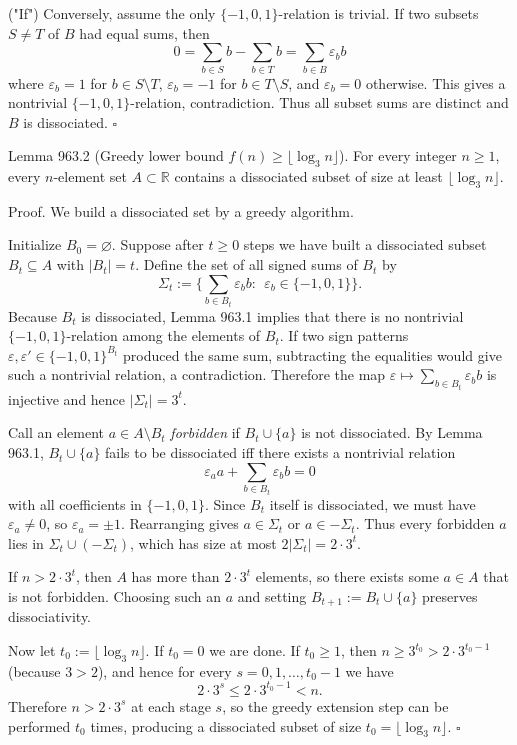 ("If") Conversely, assume the only $\{-1,0,1\}$-relation is trivial. If two subsets $S\ne T$ of $B$ had equal sums, then
\[
0=\sum_{b\in S}b-\sum_{b\in T}b=
\sum_{b\in B}\varepsilon_b b
\]
where $\varepsilon_b=1$ for $b\in S\setminus T$, $\varepsilon_b=-1$ for $b\in T\setminus S$, and $\varepsilon_b=0$ otherwise. This gives a nontrivial $\{-1,0,1\}$-relation, contradiction. Thus all subset sums are distinct and $B$ is dissociated. $\square$

Lemma 963.2 (Greedy lower bound $f(n)\ge \lfloor \log_3 n\rfloor$).
For every integer $n\ge 1$, every $n$-element set $A\subset\mathbb R$ contains a dissociated subset of size at least $\lfloor \log_3 n\rfloor$.

Proof.
We build a dissociated set by a greedy algorithm.

Initialize $B_0=\varnothing$.
Suppose after $t\ge 0$ steps we have built a dissociated subset $B_t\subseteq A$ with $|B_t|=t$.
Define the set of all signed sums of $B_t$ by
\[
\Sigma_t:=\Big\{\sum_{b\in B_t}\varepsilon_b b:\ \ \varepsilon_b\in\{-1,0,1\}\Big\}.
\]
Because $B_t$ is dissociated, Lemma 963.1 implies that there is no nontrivial $\{-1,0,1\}$-relation among the elements of $B_t$.
If two sign patterns $\varepsilon,\varepsilon'\in\{-1,0,1\}^{B_t}$ produced the same sum, subtracting the equalities would give such a nontrivial relation, a contradiction.
Therefore the map $\varepsilon\mapsto\sum_{b\in B_t}\varepsilon_b b$ is injective and hence $|\Sigma_t|=3^t$.

Call an element $a\in A\setminus B_t$ \emph{forbidden} if $B_t\cup\{a\}$ is not dissociated.
By Lemma 963.1, $B_t\cup\{a\}$ fails to be dissociated iff there exists a nontrivial relation
\[
\varepsilon_a a + \sum_{b\in B_t}\varepsilon_b b = 0
\]
with all coefficients in $\{-1,0,1\}$. Since $B_t$ itself is dissociated, we must have $\varepsilon_a\neq 0$, so $\varepsilon_a=\pm 1$.
Rearranging gives $a\in\Sigma_t$ or $a\in-\Sigma_t$.
Thus every forbidden $a$ lies in $\Sigma_t\cup(-\Sigma_t)$, which has size at most $2|\Sigma_t|=2\cdot 3^t$.

If $n>2\cdot 3^t$, then $A$ has more than $2\cdot 3^t$ elements, so there exists some $a\in A$ that is not forbidden.
Choosing such an $a$ and setting $B_{t+1}:=B_t\cup\{a\}$ preserves dissociativity.

Now let $t_0:=\lfloor\log_3 n\rfloor$. If $t_0=0$ we are done. If $t_0\ge 1$, then $n\ge 3^{t_0}>2\cdot 3^{t_0-1}$ (because $3>2$), and hence for every $s=0,1,\dots,t_0-1$ we have
\[
2\cdot 3^s \le 2\cdot 3^{t_0-1} < n.
\]
Therefore $n>2\cdot 3^s$ at each stage $s$, so the greedy extension step can be performed $t_0$ times, producing a dissociated subset of size $t_0=\lfloor\log_3 n\rfloor$. $\square$

